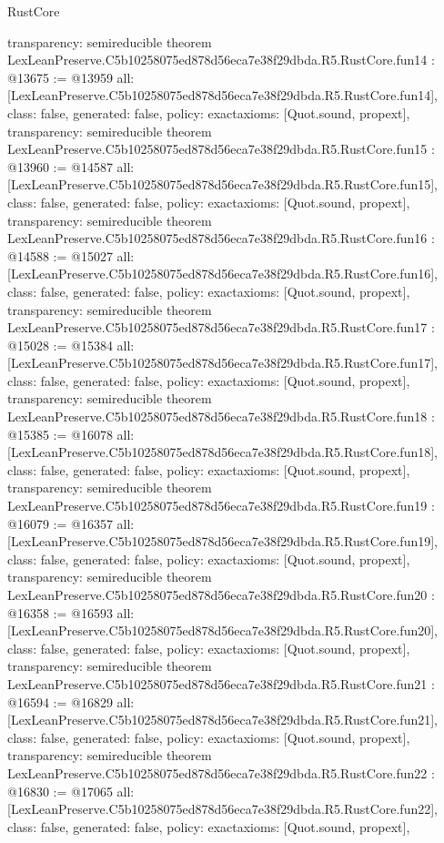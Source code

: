 \begin{lexlean}{RustCore}
\begin{coremodule}
{  transparency: semireducible
}
theorem LexLeanPreserve.C5b10258075ed878d56eca7e38f29dbda.R5.RustCore.fun14 : @13675 := @13959 {
  all: [LexLeanPreserve.C5b10258075ed878d56eca7e38f29dbda.R5.RustCore.fun14],
  class: false,
  generated: false,
  policy: exact{axioms: [Quot.sound, propext]},
  transparency: semireducible
}
theorem LexLeanPreserve.C5b10258075ed878d56eca7e38f29dbda.R5.RustCore.fun15 : @13960 := @14587 {
  all: [LexLeanPreserve.C5b10258075ed878d56eca7e38f29dbda.R5.RustCore.fun15],
  class: false,
  generated: false,
  policy: exact{axioms: [Quot.sound, propext]},
  transparency: semireducible
}
theorem LexLeanPreserve.C5b10258075ed878d56eca7e38f29dbda.R5.RustCore.fun16 : @14588 := @15027 {
  all: [LexLeanPreserve.C5b10258075ed878d56eca7e38f29dbda.R5.RustCore.fun16],
  class: false,
  generated: false,
  policy: exact{axioms: [Quot.sound, propext]},
  transparency: semireducible
}
theorem LexLeanPreserve.C5b10258075ed878d56eca7e38f29dbda.R5.RustCore.fun17 : @15028 := @15384 {
  all: [LexLeanPreserve.C5b10258075ed878d56eca7e38f29dbda.R5.RustCore.fun17],
  class: false,
  generated: false,
  policy: exact{axioms: [Quot.sound, propext]},
  transparency: semireducible
}
theorem LexLeanPreserve.C5b10258075ed878d56eca7e38f29dbda.R5.RustCore.fun18 : @15385 := @16078 {
  all: [LexLeanPreserve.C5b10258075ed878d56eca7e38f29dbda.R5.RustCore.fun18],
  class: false,
  generated: false,
  policy: exact{axioms: [Quot.sound, propext]},
  transparency: semireducible
}
theorem LexLeanPreserve.C5b10258075ed878d56eca7e38f29dbda.R5.RustCore.fun19 : @16079 := @16357 {
  all: [LexLeanPreserve.C5b10258075ed878d56eca7e38f29dbda.R5.RustCore.fun19],
  class: false,
  generated: false,
  policy: exact{axioms: [Quot.sound, propext]},
  transparency: semireducible
}
theorem LexLeanPreserve.C5b10258075ed878d56eca7e38f29dbda.R5.RustCore.fun20 : @16358 := @16593 {
  all: [LexLeanPreserve.C5b10258075ed878d56eca7e38f29dbda.R5.RustCore.fun20],
  class: false,
  generated: false,
  policy: exact{axioms: [Quot.sound, propext]},
  transparency: semireducible
}
theorem LexLeanPreserve.C5b10258075ed878d56eca7e38f29dbda.R5.RustCore.fun21 : @16594 := @16829 {
  all: [LexLeanPreserve.C5b10258075ed878d56eca7e38f29dbda.R5.RustCore.fun21],
  class: false,
  generated: false,
  policy: exact{axioms: [Quot.sound, propext]},
  transparency: semireducible
}
theorem LexLeanPreserve.C5b10258075ed878d56eca7e38f29dbda.R5.RustCore.fun22 : @16830 := @17065 {
  all: [LexLeanPreserve.C5b10258075ed878d56eca7e38f29dbda.R5.RustCore.fun22],
  class: false,
  generated: false,
  policy: exact{axioms: [Quot.sound, propext]},
}
\end{coremodule}
\end{lexlean}
